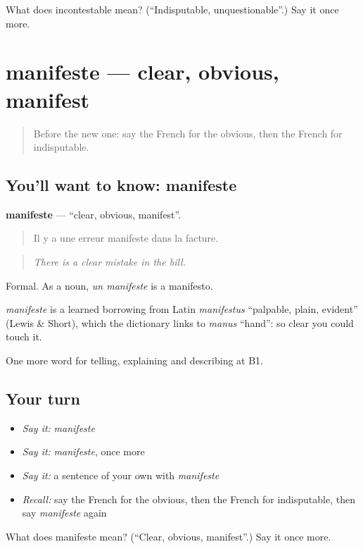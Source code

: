 \begin{tcolorbox}[breakable,colback=teal!4,colframe=teal!35!black,title={Before you move on}]
What does incontestable mean? (\textquotedblleft{}Indisputable, unquestionable\textquotedblright{}.) Say it once more.
\end{tcolorbox}
\section[manifeste]{manifeste — clear, obvious, manifest}

\label{lesson:FR-C339-manifeste}



\begin{quote}
Before the new one: say the French for the obvious, then the French for indisputable.
\end{quote}

\subsection*{You'll want to know: manifeste}
\textbf{manifeste} — \textquotedblleft{}clear, obvious, manifest\textquotedblright{}.

\begin{quote}
Il y a une erreur manifeste dans la facture.
\end{quote}

\begin{quote}
\emph{There is a clear mistake in the bill.}
\end{quote}

Formal. As a noun, \emph{un manifeste} is a manifesto.

\begin{cousinweb}
\emph{manifeste} is a learned borrowing from Latin \emph{manifestus} \textquotedblleft{}palpable, plain, evident\textquotedblright{} (Lewis \& Short), which the dictionary links to \emph{manus} \textquotedblleft{}hand\textquotedblright{}: so clear you could touch it.
\end{cousinweb}

\begin{grammarlens}[title={What you've built}]
One more word for telling, explaining and describing at B1.
\end{grammarlens}

\subsection*{Your turn}
\begin{itemize}
\raggedright
  \item \emph{Say it:} \emph{manifeste}
  \item \emph{Say it:} \emph{manifeste}, once more
  \item \emph{Say it:} a sentence of your own with \emph{manifeste}
  \item \emph{Recall:} say the French for the obvious, then the French for indisputable, then say \emph{manifeste} again
\end{itemize}

\begin{tcolorbox}[breakable,colback=teal!4,colframe=teal!35!black,title={Before you move on}]
What does manifeste mean? (\textquotedblleft{}Clear, obvious, manifest\textquotedblright{}.) Say it once more.
\end{tcolorbox}
